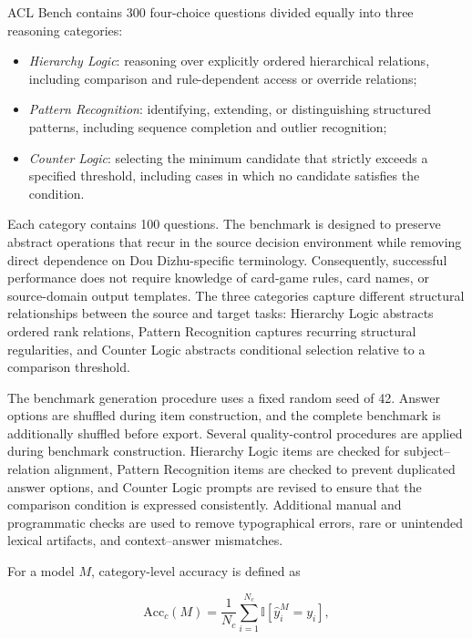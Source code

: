 ACL Bench contains 300 four-choice questions divided equally into three reasoning categories:

\begin{itemize}
    \item \emph{Hierarchy Logic}: reasoning over explicitly ordered hierarchical relations, including comparison and rule-dependent access or override relations;

    \item \emph{Pattern Recognition}: identifying, extending, or distinguishing structured patterns, including sequence completion and outlier recognition;

    \item \emph{Counter Logic}: selecting the minimum candidate that strictly exceeds a specified threshold, including cases in which no candidate satisfies the condition.
\end{itemize}

Each category contains 100 questions. The benchmark is designed to preserve abstract operations that recur in the source decision environment while removing direct dependence on Dou Dizhu-specific terminology. Consequently, successful performance does not require knowledge of card-game rules, card names, or source-domain output templates. The three categories capture different structural relationships between the source and target tasks: Hierarchy Logic abstracts ordered rank relations, Pattern Recognition captures recurring structural regularities, and Counter Logic abstracts conditional selection relative to a comparison threshold.

The benchmark generation procedure uses a fixed random seed of 42. Answer options are shuffled during item construction, and the complete benchmark is additionally shuffled before export. Several quality-control procedures are applied during benchmark construction. Hierarchy Logic items are checked for subject--relation alignment, Pattern Recognition items are checked to prevent duplicated answer options, and Counter Logic prompts are revised to ensure that the comparison condition is expressed consistently. Additional manual and programmatic checks are used to remove typographical errors, rare or unintended lexical artifacts, and context--answer mismatches.

For a model $M$, category-level accuracy is defined as

\begin{equation}
\mathrm{Acc}_{c}(M)
=
\frac{1}{N_{c}}
\sum_{i=1}^{N_{c}}
\mathbb{I}
\left[
\hat{y}_{i}^{M}=y_{i}
\right],
\label{eq:acl_category_accuracy}
\end{equation}

